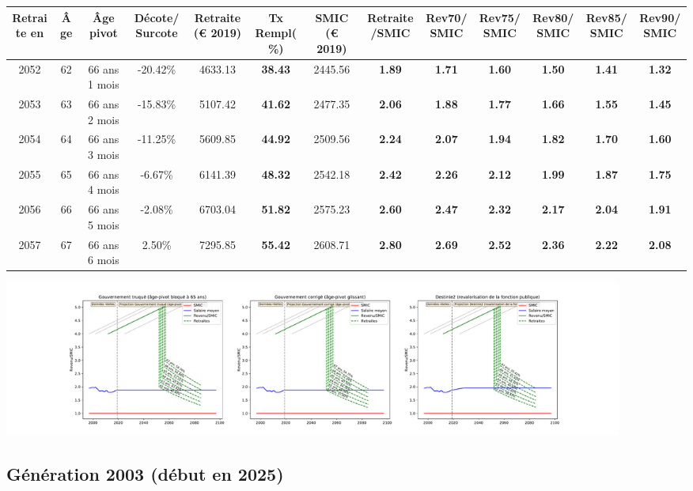 { \scriptsize \begin{center} 
\begin{tabular}[htb]{|c|c||c|c||c|c||c||c|c|c|c|c|c|} 
\hline 
 Retraite en &  Âge &  Âge pivot &  Décote/Surcote &  Retraite (\euro{} 2019) &  Tx Rempl(\%) &  SMIC (\euro{} 2019) &  Retraite/SMIC &  Rev70/SMIC &  Rev75/SMIC &  Rev80/SMIC &  Rev85/SMIC &  Rev90/SMIC \\ 
\hline \hline 
 2052 &  62 &  66 ans 1 mois &  -20.42\% &  4633.13 &  {\bf 38.43} &  2445.56 &  {\bf 1.89} &  {\bf 1.71} &  {\bf 1.60} &  {\bf 1.50} &  {\bf 1.41} &  {\bf 1.32} \\ 
\hline 
 2053 &  63 &  66 ans 2 mois &  -15.83\% &  5107.42 &  {\bf 41.62} &  2477.35 &  {\bf 2.06} &  {\bf 1.88} &  {\bf 1.77} &  {\bf 1.66} &  {\bf 1.55} &  {\bf 1.45} \\ 
\hline 
 2054 &  64 &  66 ans 3 mois &  -11.25\% &  5609.85 &  {\bf 44.92} &  2509.56 &  {\bf 2.24} &  {\bf 2.07} &  {\bf 1.94} &  {\bf 1.82} &  {\bf 1.70} &  {\bf 1.60} \\ 
\hline 
 2055 &  65 &  66 ans 4 mois &  -6.67\% &  6141.39 &  {\bf 48.32} &  2542.18 &  {\bf 2.42} &  {\bf 2.26} &  {\bf 2.12} &  {\bf 1.99} &  {\bf 1.87} &  {\bf 1.75} \\ 
\hline 
 2056 &  66 &  66 ans 5 mois &  -2.08\% &  6703.04 &  {\bf 51.82} &  2575.23 &  {\bf 2.60} &  {\bf 2.47} &  {\bf 2.32} &  {\bf 2.17} &  {\bf 2.04} &  {\bf 1.91} \\ 
\hline 
 2057 &  67 &  66 ans 6 mois &  2.50\% &  7295.85 &  {\bf 55.42} &  2608.71 &  {\bf 2.80} &  {\bf 2.69} &  {\bf 2.52} &  {\bf 2.36} &  {\bf 2.22} &  {\bf 2.08} \\ 
\hline 
\hline 
\end{tabular} 
\end{center} } 

 \begin{center}\includegraphics[width=0.9\textwidth]{fig/Ascendant45_1990_22_dest_retraite.pdf}\end{center} \label{fig/Ascendant45_1990_22_dest_retraite.pdf} 

\newpage 
 
\subsection{Génération 2003 (début en 2025)} 

